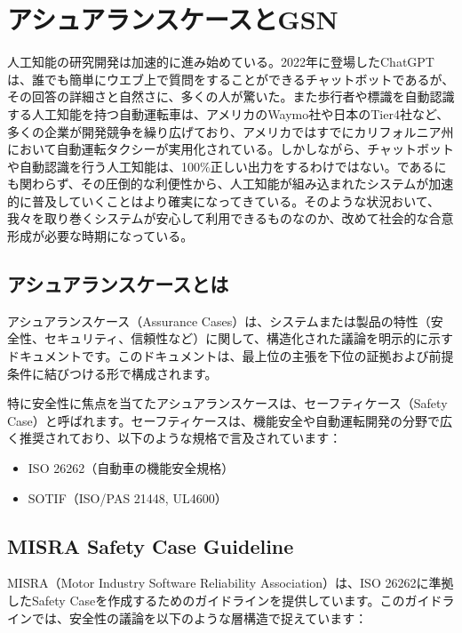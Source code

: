\chapter{アシュアランスケースとGSN}
\label{chap5}

人工知能の研究開発は加速的に進み始めている。2022年に登場したChatGPTは、誰でも簡単にウエブ上で質問をすることができるチャットボットであるが、その回答の詳細さと自然さに、多くの人が驚いた。また歩行者や標識を自動認識する人工知能を持つ自動運転車は、アメリカのWaymo社や日本のTier4社など、多くの企業が開発競争を繰り広げており、アメリカではすでにカリフォルニア州において自動運転タクシーが実用化されている。しかしながら、チャットボットや自動認識を行う人工知能は、100\%正しい出力をするわけではない。であるにも関わらず、その圧倒的な利便性から、人工知能が組み込まれたシステムが加速的に普及していくことはより確実になってきている。そのような状況おいて、我々を取り巻くシステムが安心して利用できるものなのか、改めて社会的な合意形成が必要な時期になっている。

\section{アシュアランスケースとは}

アシュアランスケース（Assurance Cases）は、システムまたは製品の特性（安全性、セキュリティ、信頼性など）に関して、構造化された議論を明示的に示すドキュメントです。このドキュメントは、最上位の主張を下位の証拠および前提条件に結びつける形で構成されます。

特に安全性に焦点を当てたアシュアランスケースは、セーフティケース（Safety Case）と呼ばれます。セーフティケースは、機能安全や自動運転開発の分野で広く推奨されており、以下のような規格で言及されています：

\begin{itemize}
    \item ISO 26262（自動車の機能安全規格）
    \item SOTIF（ISO/PAS 21448, UL4600）
\end{itemize}

\section{MISRA Safety Case Guideline}

MISRA（Motor Industry Software Reliability Association）は、ISO 26262に準拠したSafety Caseを作成するためのガイドラインを提供しています。このガイドラインでは、安全性の議論を以下のような層構造で捉えています：

